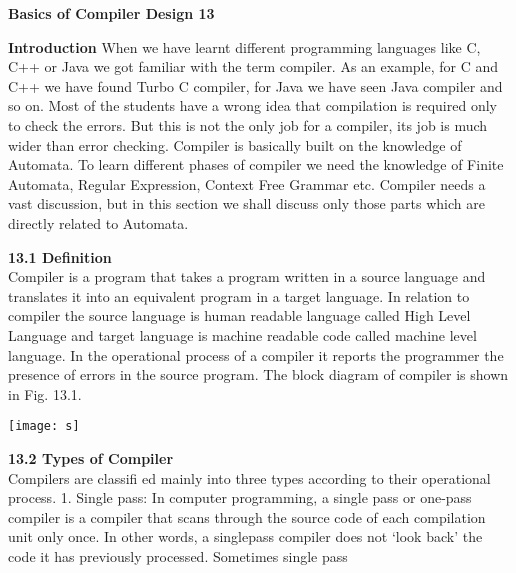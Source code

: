 \documentclass[a4paper]{article}
\begin{document}
\newpage
\begin{flushleft}
\textbf{\huge \bf Basics of Compiler Design\hspace{1.5cm} 13}
\end{flushleft}
\textbf{\bf Introduction}
 When we have learnt different programming languages like C, C++ or Java we got familiar with the term compiler. As an example, for C and C++ we have found Turbo C compiler, for Java we have seen Java compiler and so on. Most of the students have a wrong idea that compilation is required only to check the errors. But this is not the only job for a compiler, its job is much wider than error checking. Compiler is basically built on the knowledge of Automata. To learn different phases of compiler we need the knowledge of Finite Automata, Regular Expression, Context Free Grammar etc. Compiler needs a vast discussion, but in this section we shall discuss only those parts which are directly related to Automata.
 
\vspace{5mm}
\begin{flushleft}
\textbf{ \bf 13.1 Definition}\\   
Compiler is a program that takes a program written in a source language and translates it into an equivalent program in a target language. In relation to compiler the source language is human readable  language called High Level Language and target language is machine readable code called machine level language. In the operational process of a compiler it reports the programmer the presence of errors in the source program. The block diagram of compiler is shown in Fig. 13.1.
\end{flushleft}
\begin{center}
\texttt{[image: s]}
\end{center}
\begin{flushleft}
\textbf{13.2 Types of Compiler}\\
 Compilers are classiﬁ ed mainly into three types according to their operational process.  1. Single pass: In computer programming, a single pass or one-pass compiler is a compiler that scans through the source code of each compilation unit only once. In other words, a singlepass compiler does not ‘look back’ the code it has previously processed. Sometimes single pass
\end{flushleft}
\end{document}
